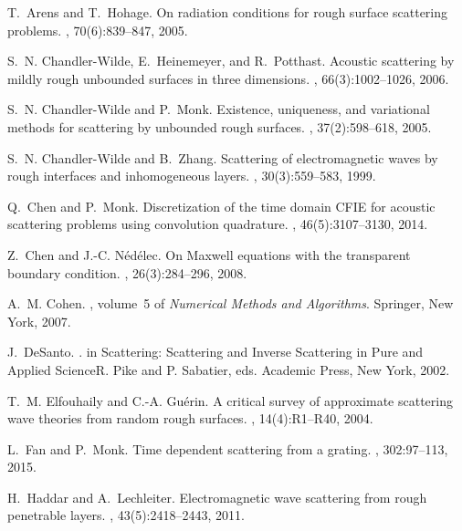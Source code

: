 \documentclass[11pt,reqno]{amsart}
\numberwithin{equation}{section}
\begin{document}
\begin{thebibliography}{10}

T.~Arens and T.~Hohage.
\newblock On radiation conditions for rough surface scattering problems.
, 70(6):839--847, 2005.

S.~N. Chandler-Wilde, E.~Heinemeyer, and R.~Potthast.
\newblock Acoustic scattering by mildly rough unbounded surfaces in three
  dimensions.
, 66(3):1002--1026, 2006.

S.~N. Chandler-Wilde and P.~Monk.
\newblock Existence, uniqueness, and variational methods for scattering by
  unbounded rough surfaces.
, 37(2):598--618, 2005.

S.~N. Chandler-Wilde and B.~Zhang.
\newblock Scattering of electromagnetic waves by rough interfaces and
  inhomogeneous layers.
, 30(3):559--583, 1999.

Q.~Chen and P.~Monk.
\newblock Discretization of the time domain {CFIE} for acoustic scattering
  problems using convolution quadrature.
, 46(5):3107--3130, 2014.

Z.~Chen and J.-C. N{\'e}d{\'e}lec.
\newblock On {M}axwell equations with the transparent boundary condition.
, 26(3):284--296, 2008.

A.~M. Cohen.
, volume~5
  of {\em Numerical Methods and Algorithms}.
\newblock Springer, New York, 2007.

J.~DeSanto.
.
\newblock in Scattering: Scattering and Inverse Scattering in Pure and Applied
  ScienceR. Pike and P. Sabatier, eds. Academic Press, New York, 2002.

T.~M. Elfouhaily and C.-A. Gu{\'e}rin.
\newblock A critical survey of approximate scattering wave theories from random
  rough surfaces.
, 14(4):R1--R40, 2004.

L.~Fan and P.~Monk.
\newblock Time dependent scattering from a grating.
, 302:97--113, 2015.

H.~Haddar and A.~Lechleiter.
\newblock Electromagnetic wave scattering from rough penetrable layers.
, 43(5):2418--2443, 2011.


\end{thebibliography}
\end{document}
